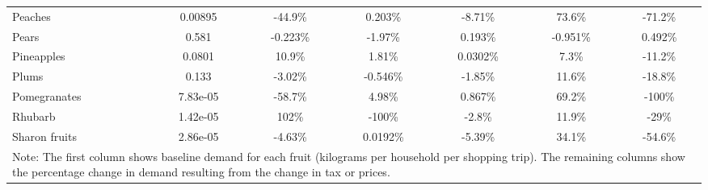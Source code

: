 \documentclass[11pt]{article}
\begin{document}
\begin{table}[h]
\begin{center}
{\begin{tabular}{lcccccc}
\hline
Peaches &0.00895 &-44.9\% &0.203\% &-8.71\% &73.6\% &-71.2\% \\
Pears &0.581 &-0.223\% &-1.97\% &0.193\% &-0.951\% &0.492\% \\
Pineapples &0.0801 &10.9\% &1.81\% &0.0302\% &7.3\% &-11.2\% \\
Plums &0.133 &-3.02\% &-0.546\% &-1.85\% &11.6\% &-18.8\% \\
Pomegranates &7.83e-05 &-58.7\% &4.98\% &0.867\% &69.2\% &-100\% \\
\hline
Rhubarb &1.42e-05 &102\% &-100\% &-2.8\% &11.9\% &-29\% \\
Sharon fruits &2.86e-05 &-4.63\% &0.0192\% &-5.39\% &34.1\% &-54.6\% \\
 \hline \hline
\multicolumn{7}{p{1.0 \textwidth}}{Note: The first column shows baseline demand for each fruit (kilograms per household per shopping trip). The remaining columns show the percentage change in demand resulting from the change in tax or prices.}
\end{tabular}}
\end{center}
\end{table}
\end{document}
